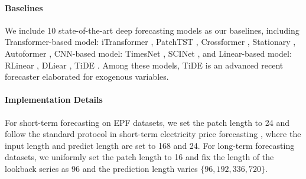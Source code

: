 \documentclass[nohyperref]{article}
\theoremstyle{plain}
\theoremstyle{definition}
\theoremstyle{remark}
\begin{document}
\paragraph{Baselines} We include 10 state-of-the-art deep forecasting models as our baselines, including Transformer-based model: iTransformer \cite{liu2023itransformer}, PatchTST \cite{nie2022time}, Crossformer \cite{zhang2022crossformer}, Stationary \cite{liu2022non}, Autoformer \cite{wu2021autoformer}, CNN-based model: TimesNet \cite{wu2023timesnet}, SCINet \cite{liu2022scinet}, and Linear-based model: RLinear \cite{li2023revisiting}, DLiear \cite{zeng2023transformers}, TiDE \cite{das2023long}. Among these models, TiDE is an advanced recent forecaster elaborated for exogenous variables.

\paragraph{Implementation Details} 
For short-term forecasting on EPF datasets, we set the patch length to 24 and follow the standard protocol in short-term electricity price forecasting \cite{olivares2023neural}, where the input length and predict length are set to 168 and 24. For long-term forecasting datasets, we uniformly set the patch length to 16 and fix the length of the lookback series as 96 and the prediction length varies $\{96, 192, 336, 720\}$.  
\end{document}

